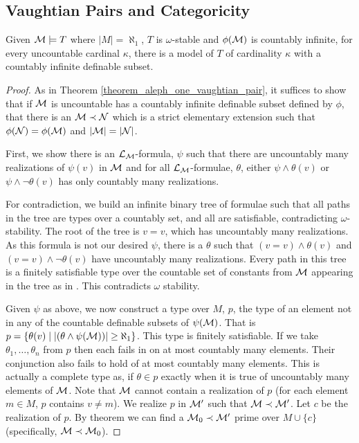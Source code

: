 \subsection{Vaughtian Pairs and Categoricity}


\begin{theorem}\label{theorem_uncountable_vaughtian_pairs}
Given \(\mathcal{M} \models T\) where \(|M| = \aleph_1\), \(T\) is \(\omega\)-stable and \(\phi(\mathcal{M})\) is countably infinite, for every uncountable cardinal \(\kappa\), there is a model of \(T\) of cardinality \(\kappa\) with a countably infinite definable subset.  
\end{theorem}

\begin{proof}
As in Theorem \ref{theorem_aleph_one_vaughtian_pair}, it suffices to show that if \(\mathcal{M}\) is uncountable has a countably infinite definable subset defined by \(\phi\), that there is an \(\mathcal{M} \prec \mathcal{N}\) which is a strict elementary extension such that \(\phi(\mathcal{N}) = \phi(\mathcal{M})\) and \(|\mathcal{M}| = |\mathcal{N}|\).

First, we show there is an \(\mathcal{L}_{\mathcal{M}}\)-formula, \(\psi\) such that there are uncountably many realizations of \(\psi(v)\) in \(\mathcal{M}\) and for all \(\mathcal{L}_{\mathcal{M}}\)-formulae, \(\theta\), either \(\psi \land \theta(v)\) or \(\psi \land \neg\theta(v)\) has only countably many realizations. 

For contradiction, we build an infinite binary tree of formulae such that all paths in the tree are types over a countably set, and all are satisfiable, contradicting \(\omega\)-stability.  
The root of the tree is \(v = v\), which has uncountably many realizations. 
As this formula is not our desired \(\psi\), there is a \(\theta\) such that \((v = v) \land \theta(v)\) and \((v = v) \land \neg \theta(v)\) have uncountably many realizations. 
Every path in this tree is a finitely satisfiable type over the countable set of constants from \(\mathcal{M}\) appearing in the tree as in %
.
This contradicts \(\omega\) stability. 

Given \(\psi\) as above, we now construct a type over \(M\), \(p\), the type of an element not in any of the countable definable subsets of \(\psi(\mathcal{M})\). 
That is \(p = \{\theta(v) \mid |(\theta \land \psi (\mathcal{M}))| \geq \aleph_1\}\).
This type is finitely satisfiable. If we take \(\theta_1, \ldots, \theta_n\) from \(p\) then each fails in on at most countably many elements. 
Their conjunction also fails to hold of at most countably many elements. 
This is actually a complete type as, if \(\theta \in p\) exactly when it is true of uncountably many elements of \(\mathcal{M}\).
Note that \(\mathcal{M}\) cannot contain a realization of \(p\) (for each element \(m \in M\), \(p\) contains \(v \neq m\)). 
We realize \(p\) in \(\mathcal{M}'\) such that \(\mathcal{M} \prec \mathcal{M}'\). 
Let \(c\) be the realization of \(p\). 
By theorem %
we can find a \(\mathcal{M}_0 \prec \mathcal{M}'\) prime over \(M \cup \{c\}\) (specifically, \(\mathcal{M} \prec \mathcal{M}_0\)).


\end{proof}

